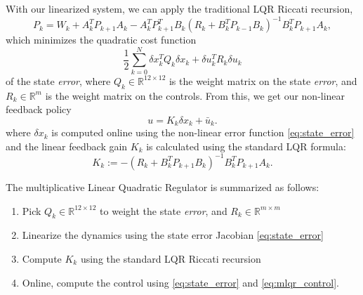 \documentclass{svproc}
\newcommand{\half}{\frac{1}{2}}
\newcommand{\R}{\mathbb{R}}
\begin{document}
    With our linearized system, we can apply the traditional LQR Riccati recursion,
    \begin{equation}
         P_k = W_k +  A_k^T P_{k+1} A_k - A_k^T P_{k+1}^T B_k (R_k + B_k^T P_{k-1} B_k)^{-1} B_k^T P_{k+1} A_k ,
    \end{equation}
    which minimizes the quadratic cost function
    \begin{equation}
        \half \sum_{k=0}^N \delta x_k^T Q_k \delta x_k + \delta u_k^T R_k \delta u_k
    \end{equation}
    of the state \emph{error}, where $Q_k \in \R^{12 \times 12}$ is the weight matrix on the state \emph{error}, and $R_k \in \R^m$ is the weight matrix on the controls. From this, we get our non-linear feedback policy
    \begin{equation} \label{eq:mlqr_control}
        u = K_k \delta x_k + \bar{u}_k.
    \end{equation}
    where $\delta x_k$ is computed online using the non-linear error function \eqref{eq:state_error} and the linear feedback gain $K_k$ is calculated using the standard LQR formula:
    \begin{equation} \label{eq:LQR_gain}
         K_k := -(R_k + B_k^T P_{k+1} B_k)^{-1} B_k^T P_{k+1} A_k.
    \end{equation}
    
    The multiplicative Linear Quadratic Regulator is summarized as follows:
    \begin{enumerate}
        \item Pick $Q_k \in \R^{12 \times 12}$ to weight the state \textit{error}, and $R_k \in \R^{m \times m}$
        \item Linearize the dynamics using the state error Jacobian \eqref{eq:state_error}
        \item Compute $K_k$ using the standard LQR Riccati recursion
        \item Online, compute the control using \eqref{eq:state_error} and \eqref{eq:mlqr_control}.
    \end{enumerate}
    
    
\end{document}

